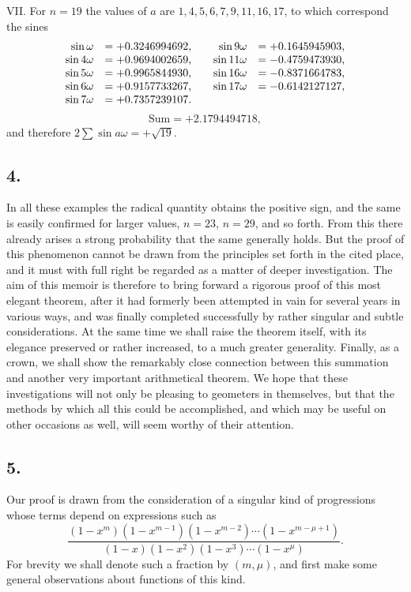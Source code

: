 \documentclass[12pt]{article}
\begin{document}
VII. For $n=19$ the values of $a$ are $1,4,5,6,7,9,11,16,17$, to which correspond the sines
\[
\begin{array}{rl@{\qquad}rl}
\sin\omega &= +0.3246994692,& \sin9\omega &= +0.1645945903,\\
\sin4\omega &= +0.9694002659,& \sin11\omega &= -0.4759473930,\\
\sin5\omega &= +0.9965844930,& \sin16\omega &= -0.8371664783,\\
\sin6\omega &= +0.9157733267,& \sin17\omega &= -0.6142127127,\\
\sin7\omega &= +0.7357239107.&
\end{array}
\]
\[
\text{Sum}=+2.1794494718,
\]
and therefore $2\sum\sin a\omega=+\sqrt{19}$.

\subsection*{4.}

In all these examples the radical quantity obtains the positive sign, and the same is easily confirmed for larger values, $n=23$, $n=29$, and so forth. From this there already arises a strong probability that the same generally holds. But the proof of this phenomenon cannot be drawn from the principles set forth in the cited place, and it must with full right be regarded as a matter of deeper investigation. The aim of this memoir is therefore to bring forward a rigorous proof of this most elegant theorem, after it had formerly been attempted in vain for several years in various ways, and was finally completed successfully by rather singular and subtle considerations. At the same time we shall raise the theorem itself, with its elegance preserved or rather increased, to a much greater generality. Finally, as a crown, we shall show the remarkably close connection between this summation and another very important arithmetical theorem. We hope that these investigations will not only be pleasing to geometers in themselves, but that the methods by which all this could be accomplished, and which may be useful on other occasions as well, will seem worthy of their attention.

\subsection*{5.}

Our proof is drawn from the consideration of a singular kind of progressions whose terms depend on expressions such as
\[
\frac{(1-x^m)(1-x^{m-1})(1-x^{m-2})\cdots(1-x^{m-\mu+1})}
{(1-x)(1-x^2)(1-x^3)\cdots(1-x^\mu)}.
\]
For brevity we shall denote such a fraction by $(m,\mu)$, and first make some general observations about functions of this kind.
\end{document}
